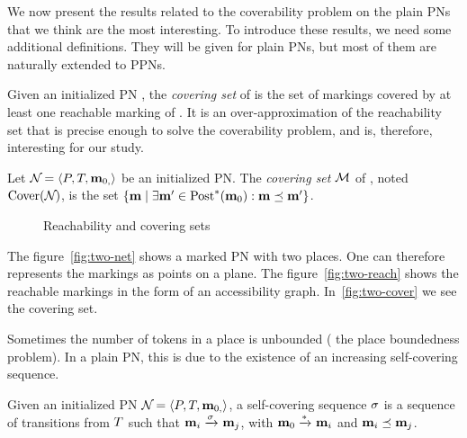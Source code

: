 We now present the results related to the coverability problem on the plain \acp{PN} that we think are the most interesting.
To introduce these results, we need some additional definitions.
They will be given for plain \acp{PN}, but most of them are naturally extended to \acp{PPN}.

Given an initialized \ac{PN} \namePN, the \emph{covering set} of \namePN is the set of markings covered by at least one reachable marking of \namePN.
It is an over-approximation of the reachability set that is precise enough to solve the coverability problem, and is, therefore, interesting for our study.

\begin{defi}
  Let $\mathcal{N}_{} = \left\langle P_{}, T_{}, \mathbf{m}_{0,}\right\rangle$ be an initialized \ac{PN}.
  The \emph{covering set} $\mathcal{M}$ of \namePN, noted $\operatorname{Cover}(\mathcal{N}_{})$, is the set $\left\{\mathbf{m} \mid \exists \mathbf{m}' \in \operatorname{Post}^*_{}(\mathbf{m}_0) : \mathbf{m} \preceq \mathbf{m}' \right\}$.
\end{defi}


\begin{figure}[htbp]
  \label{fig:reach-and-cover-example}
  \centering
  \subfloat[A \ac{PN} ($\card{\places} = 2$)]{
    \label{fig:two-net}
    

  }

  \qquad
  \caption{Reachability and covering sets}
\end{figure}

The figure~\ref{fig:two-net} shows a marked \ac{PN} with two places.
One can therefore represents the markings as points on a plane.
The figure~\ref{fig:two-reach} shows the reachable markings in the form of an accessibility graph.
In~\ref{fig:two-cover} we see the covering set.

Sometimes the number of tokens in a place is unbounded ( the place boundedness problem).
In a plain \ac{PN}, this is due to the existence of an increasing self-covering sequence.
\begin{defi}
  Given an initialized \ac{PN} $\mathcal{N}_{} = \left\langle P_{}, T_{}, \mathbf{m}_{0,}\right\rangle$,
  a self-covering sequence $\seqt$ is a sequence of transitions from $T$ such that
  \(
    \mar_i \fire{\seqt} \mar_j
  \),
  with $\mathbf{m}_0 \xrightarrow{*}_{} \mathbf{m}_i$ %
  and $\mathbf{m}_i \preceq \mathbf{m}_j$.
\end{defi}

